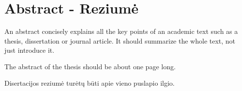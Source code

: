 
\chapter*{Abstract - Reziumė }
\label{cha:abstract}



An abstract concisely explains all the key points of an academic text such as a thesis, dissertation or journal article. It should summarize the whole text, not just introduce it.

The abstract of the thesis should be about one page long.

Disertacijos reziumė turėtų būti apie vieno puslapio ilgio.